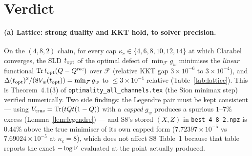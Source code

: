 \documentclass[11pt]{article}
\newcommand{\e}[1]{\times10^{#1}}
\begin{document}
\section{Verdict}
\label{sec:verdict}

\paragraph{(a) Lattice: strong duality and KKT hold, to solver precision.}
On the $(4,8,2)$ chain, for every cap $\kappa_c\in\{4,6,8,10,12,14\}$ at which Clarabel
converges, the SLD $t_{\rm opt}$ of the optimal defect of $\min_{\mathcal F}g_w$ minimises the
\emph{linear} functional $\operatorname{Tr} t_{\rm opt}(Q-Q^{\rm rec})$ over $\mathcal F$ (relative KKT gap
$3\e{-6}$ to $3\e{-4}$), and
$\Delta(t_{\rm opt})^2/(8V_w(t_{\rm opt}))=\min_{\mathcal F}g_w$ to $\le3\e{-4}$ relative
(Table~\ref{tab:lattice}).  This is Theorem~4.1(3) of \texttt{optimality\_all\_channels.tex}
(the Sion minimax step) verified numerically.  Two side findings: the Legendre pair must be kept
consistent --- using $V_{\rm true}=\operatorname{Tr}(tQt(1-Q))$ with a \emph{capped} $g_w$ produces a spurious
$1$--$7\%$ excess (Lemma~\ref{lem:legendre}) --- and S8's stored $(X,Z)$ in
\texttt{best\_4\_8\_2.npz} is $0.44\%$ above the true minimiser of its own capped form
($7.72397\e{-5}$ vs $7.69024\e{-5}$ at $\kappa_c=8$), which does not affect S8 Table~1 because
that table reports the exact $-\log\operatorname{F}$ evaluated at the point actually produced.
\end{document}
